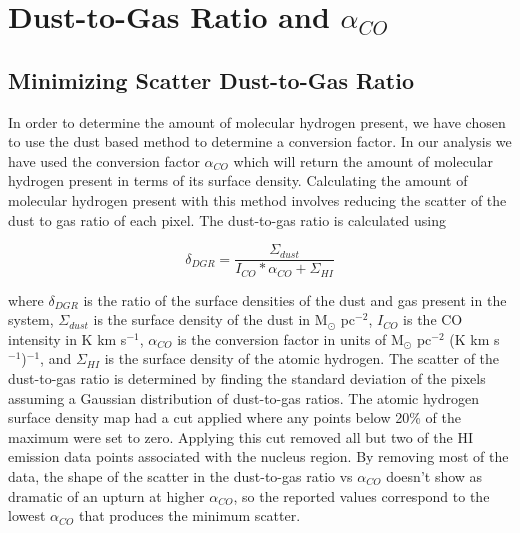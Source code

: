 \chapter{Dust-to-Gas Ratio and $\alpha_{CO}$}

\section{Minimizing Scatter Dust-to-Gas Ratio}

In order to determine the amount of molecular hydrogen present, we have chosen to use the dust based method to determine a conversion factor.  In our analysis we have used the conversion factor $\alpha_{CO}$ which will return the amount of molecular hydrogen present in terms of its surface density.  Calculating the amount of molecular hydrogen present with this method involves reducing the scatter of the dust to gas ratio of each pixel.  The dust-to-gas ratio is calculated using

\begin{equation}\label{dgr}
  \delta_{DGR} = \frac{\Sigma_{dust}}{I_{CO}*\alpha_{CO} + \Sigma_{HI}}
\end{equation}

where $\delta_{DGR}$ is the ratio of the surface densities of the dust and gas present in the system, $\Sigma_{dust}$ is the surface density of the dust in M$_\odot$ pc$^{-2}$, $I_{CO}$ is the CO intensity in K km s$^{-1}$, $\alpha_{CO}$ is the conversion factor in units of M$_\odot$ pc$^{-2}$ (K km s$^{-1}$)$^{-1}$, and $\Sigma_{HI}$ is the surface density of the atomic hydrogen.  The scatter of the dust-to-gas ratio is determined by finding the standard deviation of the pixels assuming a Gaussian distribution of dust-to-gas ratios.  The atomic hydrogen surface density map had a cut applied where any points below 20\% of the maximum were set to zero.  Applying this cut removed all but two of the HI emission data points associated with the nucleus region.  By removing most of the data, the shape of the scatter in the dust-to-gas ratio vs $\alpha_{CO}$ doesn't show as dramatic of an upturn at higher $\alpha_{CO}$, so the reported values correspond to the lowest $\alpha_{CO}$ that produces the minimum scatter.

